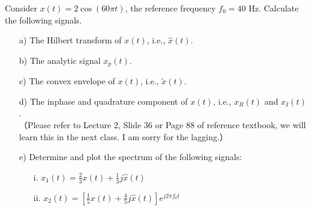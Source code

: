 \documentclass{assignment}
\begin{document}
\begin{prob}
    Consider $x(t)=2\cos(60\pi t)$, the reference frequency $f_0=40$ Hz. Calculate the following signals.
    \begin{itemize}
        \item[a)] The Hilbert transform of $x(t)$, i.e., $\hat{x}(t)$.
        \item[b)] The analytic signal $x_p(t)$.
        \item[c)] The convex envelope of $x(t)$, i.e., $\tilde{x}(t)$.
        \item[d)] The inphase and quadrature component of $x(t)$, i.e., $x_R(t)$ and $x_I(t)$.\\
        （Please refer to Lecture 2, Slide 36 or Page 88 of reference textbook, we will learn this in the next class. I am sorry for the lagging.）
        \item[e)] Determine and plot the spectrum of the following signals:
        \begin{itemize}
            \item[i.] $x_1(t)=\frac{2}{3}x(t)+\frac{1}{3}j\hat{x}(t)$
            \item[ii.] $x_2(t)=\left[\frac{1}{5}x(t)+\frac{4}{5}j\hat{x}(t)\right]e^{j2\pi f_0t}$
        \end{itemize}
    \end{itemize}
\end{prob}
\begin{sol}

\end{sol}
\end{document}
